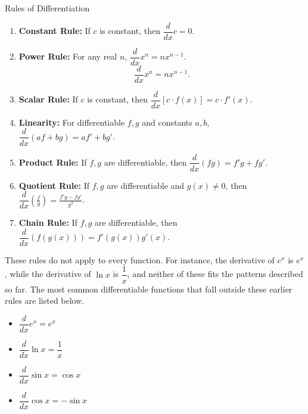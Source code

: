 \begin{theorem}{Rules of Differentiation}

    \begin{enumerate}
        \item \textbf{Constant Rule:} If $c$ is constant, then $\dfrac{d}{dx}c=0$. \vspace{0.5em}
        \item \textbf{Power Rule:} For any real $n$, $\dfrac{d}{dx}x^n = n x^{n-1}$. \vspace{0.5em}
        \[
        \frac{d}{dx}x^n = n x^{n-1}.
        \]
        \item \textbf{Scalar Rule:} If $c$ is constant, then $\dfrac{d}{dx}[c \cdot f(x)] = c \cdot f'(x)$. \vspace{0.5em}
        \item \textbf{Linearity:} For differentiable $f,g$ and constants $a,b$, $\dfrac{d}{dx}(a f + b g) = a f' + b g'$. \vspace{0.5em}
        \item \textbf{Product Rule:} If $f,g$ are differentiable, then $\dfrac{d}{dx}(f g) = f'g + fg'$. \vspace{0.5em}
        \item \textbf{Quotient Rule:} If $f,g$ are differentiable and $g(x)\neq0$, then $\dfrac{d}{dx}\left(\frac{f}{g}\right) = \frac{f'g - fg'}{g^2}$. \vspace{0.5em}
        \item \textbf{Chain Rule:} If $f,g$ are differentiable, then $\dfrac{d}{dx}(f(g(x))) = f'(g(x))g'(x)$. \vspace{0.5em}
    \end{enumerate}

\end{theorem}

These rules do not apply to every function. For instance, the derivative of $e^{x}$ is $e^{x}$, while the derivative of $\ln x$ is $\dfrac{1}{x}$, and neither of these fits the patterns described so far. The most common differentiable functions that fall outside these earlier rules are listed below.


\begin{itemize}
    \item $\dfrac{d}{dx}e^x = e^x$\vspace{0.5em}
    \item $\dfrac{d}{dx}\ln x = \dfrac{1}{x}$\vspace{0.5em}
    \item $\dfrac{d}{dx}\sin x = \cos x$\vspace{0.5em}
    \item $\dfrac{d}{dx}\cos x = -\sin x$
\end{itemize}

